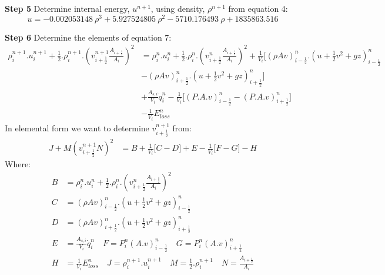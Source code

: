 \documentclass[11pt,letterpaper,titlepage]{article}
\newcommand{\half}{\frac{1}{2}}
\begin{document}
\vspace{0.5cm}\noindent
\textbf{Step 5}\newline
Determine internal energy, $u^{n+1}$, using density, $\rho^{n+1}$ from equation 4:
\begin{equation*}
u=-0.002053148 \ \rho^3+5.927524805 \ \rho^2-5710.176493 \ \rho+1835863.516 
\end{equation*}







\vspace{0.5cm}\noindent
\textbf{Step 6}\newline
Determine the elements of equation 7:
\begin{equation*}
\begin{aligned}
\rho_i^{n+1}.u_i^{n+1} + \half.\rho_i^{n+1}.(v_{i+\half}^{n+1}\frac{A_{i+\half}}{A_i})^2 &=\rho_i^{n}.u_i^{n} +\half.\rho_i^{n}.(v_{i+\half}^{n}\frac{A_{i+\half}}{A_i})^2+ \frac{1}{V_i}\biggr[ (\rho Av)_{i-\half}^n.(u+\half v^2+gz)_{i-\half}^n \\
&- (\rho Av)_{i+\half}^n.(u+\half v^2+gz)_{i+\half}^n \biggr] \\
&+\frac{A_{s,i}}{V_i}\dot{q}_i^n - \frac{1}{V_i}\biggr[   (P.A.v)_{i-\half}^n - (P.A.v)_{i+\half}^n   \biggr] \\
&- \frac{1}{V_i}E_{loss}^n
\end{aligned}
\end{equation*}
In elemental form we want to determine $v_{i+\half}^{n+1}$ from:
\begin{equation*}
\begin{aligned}
J + M(v_{i+\half}^{n+1}N)^2 &=B+\frac{1}{V_i}\biggr[ C - D \biggr]+E - \frac{1}{V_i}\biggr[   F - G   \biggr]- H
\end{aligned}
\end{equation*}
Where:
\begin{equation*}
\begin{aligned}
B&=\rho_i^{n}.u_i^{n} +\half.\rho_i^{n}.(v_{i+\half}^{n}\frac{A_{i+\half}}{A_i})^2 \\
C&=(\rho Av)_{i-\half}^n.(u+\half v^2+gz)_{i-\half}^n\\
D&=(\rho Av)_{i+\half}^n.(u+\half v^2+gz)_{i+\half}^n\\
E&=\frac{A_{s,i}}{V_i}\dot{q}_i^n \quad F=P_{i}^n(A.v)_{i-\half}^n \quad G=P_{i}^n(A.v)_{i+\half}^n\\
H&=\frac{1}{V_i}E_{loss}^n \quad J=\rho_i^{n+1}.u_i^{n+1} \quad M=\half.\rho_i^{n+1} \quad N=\frac{A_{i+\half}}{A_i}\\
\end{aligned}
\end{equation*}
\end{document}

